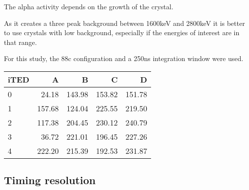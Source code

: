 The alpha activity depends on the growth of the crystal.

As it creates a three peak background between 1600keV and 2800keV it is better to use crystals with low background, especially if the energies of interest are in that range.

For this study, the 88c configuration and a 250ns integration window were used.

\begin{tabular}{lrrrr}
    \toprule
    iTED &    A  &      B &     C  &     D \\
    \midrule
    0    & 24.18 & 143.98 & 153.82 &151.78 \\
    1    &157.68 & 124.04 & 225.55 &219.50 \\
    2    &117.38 & 204.45 & 230.12 &240.79 \\
    3    & 36.72 & 221.01 & 196.45 &227.26 \\
    4    &222.20 & 215.39 & 192.53 &231.87 \\
    \bottomrule
\end{tabular}

\subsection{Timing resolution}
